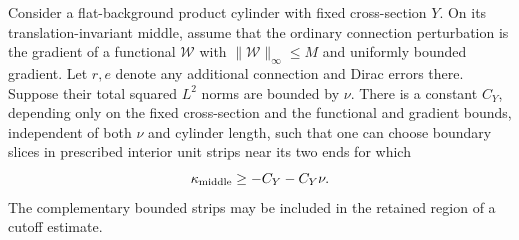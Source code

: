 \begin{lemma}
\label{lem:estimates:cylinder}
Consider a flat-background product cylinder with fixed cross-section
$Y$.  On its translation-invariant middle, assume that the ordinary
connection perturbation is the gradient of a functional
$\mathcal W$ with
$\|\mathcal W\|_\infty\leq M$ and uniformly bounded gradient.
Let $r,e$ denote any additional connection and Dirac errors there.
Suppose their total squared $L^2$ norms are bounded by $\nu$.
There is a constant $C_Y$, depending only on the fixed cross-section
and the functional and gradient bounds, independent of both $\nu$
and cylinder length, such that one can
choose boundary slices in prescribed interior unit strips near its
two ends for which
\begin{equation}
                  \kappa_{\rm middle}\geq-C_Y-C_Y\nu.
                  \label{eq:estimates:cylinder-charge}
\end{equation}
The complementary bounded strips may be included in the retained
region of a cutoff estimate.
\end{lemma}

